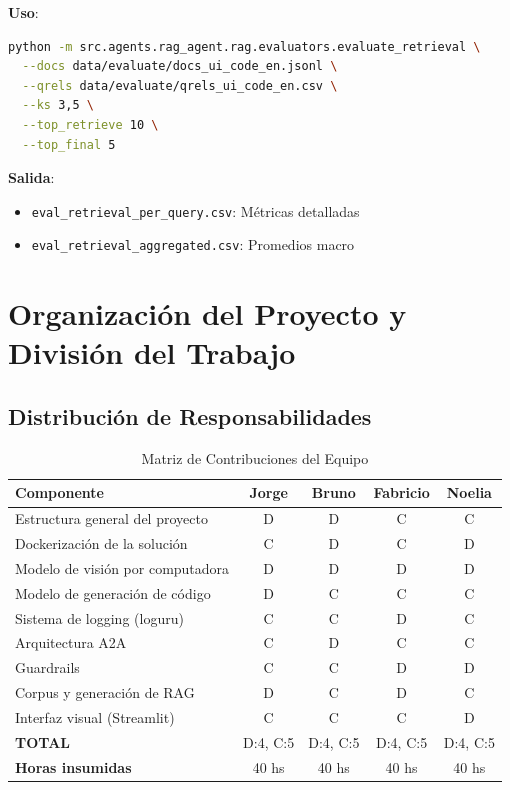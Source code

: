\documentclass[12pt,a4paper]{article}
\begin{document}
\textbf{Uso}:
\begin{lstlisting}[language=bash,caption={Ejecucion de Evaluacion}]
python -m src.agents.rag_agent.rag.evaluators.evaluate_retrieval \
  --docs data/evaluate/docs_ui_code_en.jsonl \
  --qrels data/evaluate/qrels_ui_code_en.csv \
  --ks 3,5 \
  --top_retrieve 10 \
  --top_final 5
\end{lstlisting}

\textbf{Salida}:
\begin{itemize}
    \item \texttt{eval\_retrieval\_per\_query.csv}: Métricas detalladas
    \item \texttt{eval\_retrieval\_aggregated.csv}: Promedios macro
\end{itemize}

\section{Organización del Proyecto y División del Trabajo}

\subsection{Distribución de Responsabilidades}

\begin{table}[H]
\centering
\caption{Matriz de Contribuciones del Equipo}
\begin{tabular}{lcccc}
\toprule
\textbf{Componente} & \textbf{Jorge} & \textbf{Bruno} & \textbf{Fabricio} & \textbf{Noelia} \\
\midrule
Estructura general del proyecto & D & D & C & C \\
Dockerización de la solución & C & D & C & D \\
Modelo de visión por computadora & D & D & D & D \\
Modelo de generación de código & D & C & C & C \\
Sistema de logging (loguru) & C & C & D & C \\
Arquitectura A2A & C & D & C & C \\
Guardrails & C & C & D & D \\
Corpus y generación de RAG & D & C & D & C \\
Interfaz visual (Streamlit) & C & C & C & D \\
\midrule
\textbf{TOTAL} & D:4, C:5 & D:4, C:5 & D:4, C:5 & D:4, C:5 \\
\textbf{Horas insumidas} & 40 hs & 40 hs & 40 hs & 40 hs \\
\bottomrule
\end{tabular}
\end{table}
\end{document}
